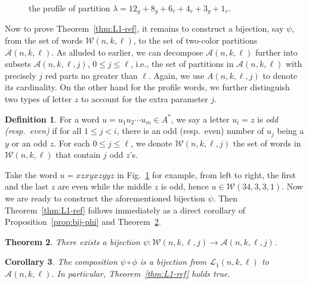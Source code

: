 \documentclass[11pt,reqno]{amsart}
\numberwithin{equation}{section}
\theoremstyle{plain}
\newtheorem{theorem}{Theorem}[section]
\newtheorem{corollary}[theorem]{Corollary}
\theoremstyle{definition}
\newtheorem{Def}[theorem]{Definition}
\newcommand{\A}{\mathcal{A}}
\renewcommand{\L}{\mathcal{L}}
\newcommand{\W}{\mathcal{W}}
\begin{document}
\begin{figure}[ht]
\begin{ferrers}

\transformto{$\phi$}
\end{ferrers}
\caption{the profile of partition $\lambda=12_g+8_g+6_r+4_r+3_g+1_r$.}
\label{fig:profile}
\end{figure}

Now to prove Theorem~\ref{thm:L1-ref}, it remains to construct a bijection, say $\psi$, from the set of words $\W(n,k,\ell)$, to the set of two-color partitions $\A(n,k,\ell)$. As alluded to earlier, we can decompose $\A(n,k,\ell)$ further into subsets $\A(n,k,\ell,j)$, $0\le j\le \ell$, i.e., the set of partitions in $\A(n,k,\ell)$ with precisely $j$ red parts no greater than $\ell$. Again, we use $A(n,k,\ell,j)$ to denote its cardinality. On the other hand for the profile words, we further distinguish two types of letter $z$ to account for the extra parameter $j$.
\begin{Def}
For a word $u=u_1u_2\cdots u_m\in A^*$, we say a letter $u_i=z$ is {\it odd (resp.~even)} if for all $1\le j< i$, there is an odd (resp.~even) number of $u_j$ being a $y$ or an odd $z$. For each $0\le j\le \ell$, we denote $\W(n,k,\ell,j)$ the set of words in $\W(n,k,\ell)$ that contain $j$ odd $z$'s.
\end{Def}
Take the word $u=xzxyxzyyz$ in Fig.~\ref{fig:profile} for example, from left to right, the first and the last $z$ are even while the middle $z$ is odd, hence $u\in\W(34,3,3,1)$. Now we are ready to construct the aforementioned bijection $\psi$. Then Theorem~\ref{thm:L1-ref} follows immediately as a direct corollary of Proposition~\ref{prop:bij-phi} and Theorem~\ref{thm:bij-psi}.

\begin{theorem}\label{thm:bij-psi}
There exists a bijection $\psi:\W(n,k,\ell,j)\to\A(n,k,\ell,j)$.
\end{theorem}

\begin{corollary}
The composition $\psi\circ\phi$ is a bijection from $\L_1(n,k,\ell)$ to $\A(n,k,\ell)$. In particular, Theorem~\ref{thm:L1-ref} holds true.
\end{corollary}
\end{document}

